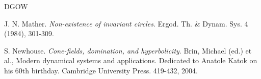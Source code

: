 \documentclass{amsart}
\begin{document}
\begin{thebibliography}{DGOW}
			
			 J. N. Mather. {\it Non-existence of invariant circles}. Ergod. Th. \& Dynam. Sys. {4} (1984), 301-309.
			
			
			
			
			
			
			
			
			
			 S. Newhouse. {\it Cone-fields, domination, and hyperbolicity}. Brin,
			Michael (ed.) et al., Modern dynamical systems and applications.
			Dedicated to Anatole Katok on his 60th birthday. Cambridge University Press. 419-432, 2004.		
			
			
			
			
			
			
			
			
			
			
			
			

\end{thebibliography}
\end{document}
